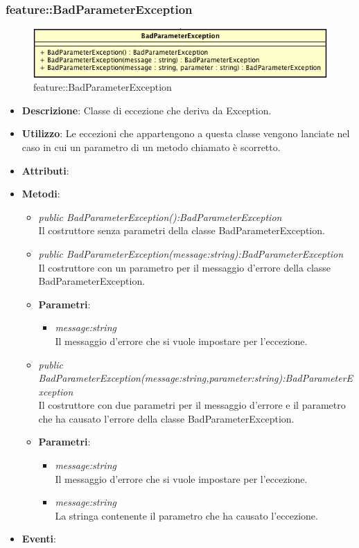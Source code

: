 \subsubsection{feature::BadParameterException}

\label{feature::BadParameterException}
\begin{figure}[ht]
	\centering
	\includegraphics[scale=0.5]{Sezioni/SottosezioniST/img/app/BadParameterException.png}
	\caption{feature::BadParameterException}
\end{figure}

\begin{itemize}
\item \textbf{Descrizione}: Classe di eccezione che deriva da Exception.
\item \textbf{Utilizzo}: Le eccezioni che appartengono a questa classe vengono lanciate nel caso in cui un parametro di un metodo chiamato è scorretto.
\item \textbf{Attributi}: 
\item \textbf{Metodi}:
	\begin{itemize}
	\item \textit{public BadParameterException():BadParameterException}\\
	Il costruttore senza parametri della classe BadParameterException.
	\item \textit{public BadParameterException(message:string):BadParameterException}\\
	Il costruttore con un parametro per il messaggio d'errore della classe BadParameterException.
			\item{\textbf{Parametri}: \begin{itemize}
			\item \textit{message:string}\\
			Il messaggio d'errore che si vuole impostare per l'eccezione.
			\end{itemize}}
	\item \textit{public BadParameterException(message:string,parameter:string):BadParameterException}\\
	Il costruttore con due parametri per il messaggio d'errore e il parametro che ha causato l'errore della classe BadParameterException.
			\item{\textbf{Parametri}: \begin{itemize}
			\item \textit{message:string}\\
			Il messaggio d'errore che si vuole impostare per l'eccezione.
			\item \textit{message:string}\\
			La stringa contenente il parametro che ha causato l'eccezione.
			\end{itemize}}
	\end{itemize}
\item \textbf{Eventi}:
\end{itemize}